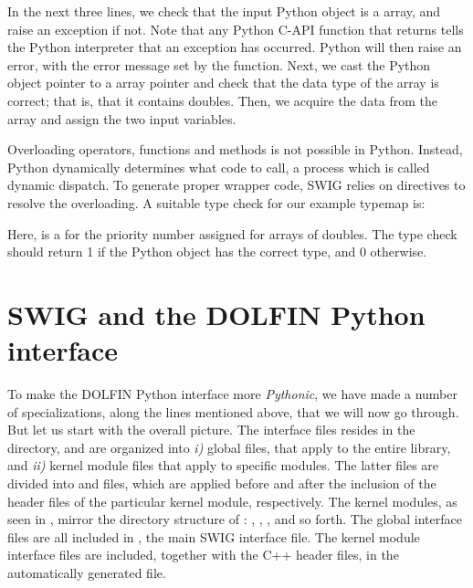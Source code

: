 In the next three lines, we check that the input Python object is a \numpy
array, and raise an exception if not.  Note that any Python C-API function
that returns  tells the Python interpreter that an exception
has occurred. Python will then raise an error, with the error message set
by the  function. Next, we cast the Python object
pointer to a \numpy array pointer and check that the data type of the
\numpy array is correct; that is, that it contains doubles. Then, we
acquire the data from the \numpy array and assign the two input variables.

Overloading operators, functions and methods is not possible in Python.
Instead, Python dynamically determines what code to call, a process
which is called dynamic dispatch.  To generate proper wrapper code,
SWIG relies on  directives to resolve the overloading.
A suitable type check for our example typemap is:
Here,  is a  for the
priority number assigned for arrays of doubles. The type check should
return 1 if the Python object  has the correct type, and
0 otherwise.

\section{SWIG and the DOLFIN Python interface}
To make the DOLFIN Python interface more \textit{Pythonic}, we have made a number of
specializations, along the lines mentioned above, that we will now
go through. But let us start with the overall picture.  The interface
files resides in the  directory, and are organized into
\textit{i)} global files, that apply to the entire \dolfin library,
and \textit{ii)} kernel module files that apply to specific \dolfin
modules. The latter files are divided into 
and  files, which are applied before and after
the inclusion of the header files of the particular kernel module,
respectively.  The kernel modules, as seen in ,
mirror the directory structure of \dolfin: , ,
,  and so forth. The global interface files are all
included in , the main SWIG interface file. The kernel
module interface files are included, together with the C++ header files,
in the automatically generated  file.

